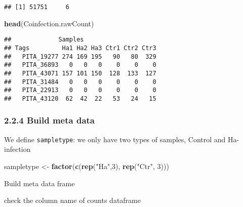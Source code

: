 \documentclass[
]{article}
\newenvironment{Shaded}{\begin{snugshade}}{\end{snugshade}}
\newcommand{\AttributeTok}[1]{\textcolor[rgb]{0.13,0.29,0.53}{#1}}
\newcommand{\DecValTok}[1]{\textcolor[rgb]{0.00,0.00,0.81}{#1}}
\newcommand{\FunctionTok}[1]{\textcolor[rgb]{0.13,0.29,0.53}{\textbf{#1}}}
\newcommand{\NormalTok}[1]{#1}
\newcommand{\OtherTok}[1]{\textcolor[rgb]{0.56,0.35,0.01}{#1}}
\newcommand{\SpecialCharTok}[1]{\textcolor[rgb]{0.81,0.36,0.00}{\textbf{#1}}}
\newcommand{\StringTok}[1]{\textcolor[rgb]{0.31,0.60,0.02}{#1}}
\begin{document}
\begin{verbatim}
## [1] 51751     6
\end{verbatim}

\begin{Shaded}
\begin{Highlighting}[]
\FunctionTok{head}\NormalTok{(Coinfection.rawCount)}
\end{Highlighting}
\end{Shaded}

\begin{verbatim}
##             Samples
## Tags         Ha1 Ha2 Ha3 Ctr1 Ctr2 Ctr3
##   PITA_19277 274 169 195   90   80  329
##   PITA_36893   0   0   0    0    0    0
##   PITA_43071 157 101 150  128  133  127
##   PITA_31484   0   0   0    0    0    0
##   PITA_22913   0   0   0    0    0    0
##   PITA_43120  62  42  22   53   24   15
\end{verbatim}

\subsubsection{2.2.4 Build meta data}\label{build-meta-data}

We define \texttt{sampletype}: we only have two types of samples,
Control and Ha-infection

\begin{Shaded}
\begin{Highlighting}[]
\NormalTok{sampletype }\OtherTok{\textless{}{-}} \FunctionTok{factor}\NormalTok{(}\FunctionTok{c}\NormalTok{(}\FunctionTok{rep}\NormalTok{(}\StringTok{"Ha"}\NormalTok{,}\DecValTok{3}\NormalTok{), }\FunctionTok{rep}\NormalTok{(}\StringTok{"Ctr"}\NormalTok{, }\DecValTok{3}\NormalTok{)))}
\end{Highlighting}
\end{Shaded}

Build meta data frame

\begin{Shaded}
\end{Shaded}

check the column name of counts dataframe

\begin{Shaded}
\end{Shaded}
\end{document}
